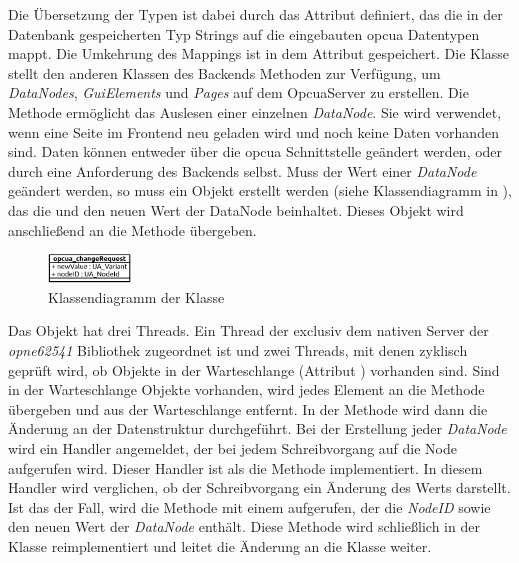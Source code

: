 Die Übersetzung der Typen ist dabei durch das Attribut  definiert, das die in der Datenbank gespeicherten Typ Strings auf die eingebauten \ac{opcua} Datentypen mappt.
Die Umkehrung des Mappings ist in dem Attribut  gespeichert.
Die Klasse  stellt den anderen Klassen des Backends Methoden zur Verfügung, um \emph{DataNodes}, \emph{GuiElements} und \emph{Pages} auf dem OpcuaServer zu erstellen.
Die Methode  ermöglicht das Auslesen einer einzelnen \emph{DataNode}. 
Sie wird verwendet, wenn eine Seite im Frontend neu geladen wird und noch keine Daten vorhanden sind.
Daten können entweder über die \ac{opcua} Schnittstelle geändert werden, oder durch eine Anforderung des Backends selbst.
Muss der Wert einer \emph{DataNode} geändert werden, so muss ein  Objekt erstellt werden (siehe Klassendiagramm in ), 
das die  und den neuen Wert der DataNode beinhaltet. Dieses Objekt wird anschließend an die Methode  übergeben.
\begin{figure}[ht]
  \centering
  \includegraphics[width=0.2\textwidth]{content/hauptteil/umsetzungPoC/backend/uml/classesOfOverview/opcua_changeRequest.pdf}
  \caption{Klassendiagramm der Klasse }
  \label{fig:backend:classDiag:opcuaCR}
\end{figure}
Das  Objekt hat drei Threads. 
Ein Thread der exclusiv dem nativen Server der \emph{opne62541} Bibliothek zugeordnet ist und zwei Threads, mit denen zyklisch geprüft wird, 
ob  Objekte in der Warteschlange (Attribut ) vorhanden sind.
Sind in der Warteschlange  Objekte vorhanden, wird jedes Element an die Methode  übergeben und aus der Warteschlange entfernt.
In der Methode  wird dann die Änderung an der Datenstruktur durchgeführt. %
Bei der Erstellung jeder \emph{DataNode} wird ein Handler angemeldet, der bei jedem Schreibvorgang auf die Node aufgerufen wird.
Dieser Handler ist als die Methode  implementiert.
In diesem Handler wird verglichen, ob der Schreibvorgang ein Änderung des Werts darstellt. 
Ist das der Fall, wird die Methode  mit einem  aufgerufen, der die \emph{NodeID} sowie den neuen Wert der \emph{DataNode} enthält.
Diese Methode wird schließlich in der  Klasse reimplementiert und leitet die Änderung an die  Klasse weiter. 